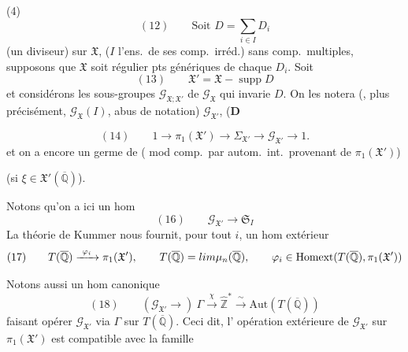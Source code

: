 \documentclass[11pt,a4paper]{article}
\begin{document}
(4)
\[
  (12)\qquad \text{Soit } \boxed{D = \sum_{i \in I} D_i}
\]
(un diviseur) sur $\mathfrak{X}$, ($I$ l'ens.\ de ses comp.\ irréd.) sans
comp.\ multiples, 
supposons que $\mathfrak{X}$ soit régulier  pts génériques
de chaque $D_i$. Soit 
\[
  (13)\qquad \mathfrak{X}' = \mathfrak{X} - \operatorname{supp} D
\]
et considérons les sous-groupes $\mathcal{G}_{\mathfrak{X};\mathfrak{X}'}$
 de
$\mathcal{G}_{\mathfrak{X}}$ qui invarie $D$. On les notera (,
plus précisément, $\mathcal{G}_{\mathfrak{X}}(I)$, abus de notation)
$\mathcal{G}_{\mathfrak{X}'}$, (\textbf{D} \ill{}

\[
  (14)\qquad 1 \to \pi_1(\mathfrak{X}') \longrightarrow
  \Sigma_{\mathfrak{X}'} \longrightarrow \mathcal{G}_{\mathfrak{X}'}
  \to 1 .
\]
et on a encore un germe de  
( mod comp.\ par autom.\ int.\ provenant de
$\pi_1(\mathfrak{X}')$)


(si $\xi \in \mathfrak{X}'(\overline{\mathbb{Q}})$).

Notons qu'on a ici un hom
\[
  (16)\qquad \mathcal{G}_{\mathfrak{X}'} \longrightarrow \mathfrak{S}_I
\]
La théorie de Kummer nous fournit, pour tout $i$, un hom extérieur
\[
  (17)\qquad T(\overline{\mathbb{Q}}) \xrightarrow{\ \varphi_i\ }
  \pi_1(\mathfrak{X}'),
  \qquad T(\overline{\mathbb{Q}}) = \varprojlim \mu_n(\overline{\mathbb{Q}}),
  \qquad \varphi_i \in \mathrm{Homext}(T(\overline{\mathbb{Q}}), \pi_1(\mathfrak{X}'))
\]

Notons aussi un hom canonique
\[
  (18)\qquad (\mathcal{G}_{\mathfrak{X}'} \to)\ \Gamma
  \xrightarrow{\ \chi\ } \widehat{\mathbb{Z}}^{*} \xrightarrow{\ \sim\ }
  \mathrm{Aut}(T(\overline{\mathbb{Q}}))
\]
faisant opérer $\mathcal{G}_{\mathfrak{X}'}$ via $\Gamma$ sur
$T(\overline{\mathbb{Q}})$. Ceci dit, l' opération extérieure
de $\mathcal{G}_{\mathfrak{X}'}$ sur $\pi_1(\mathfrak{X}')$ est compatible avec
la famille
\end{document}

